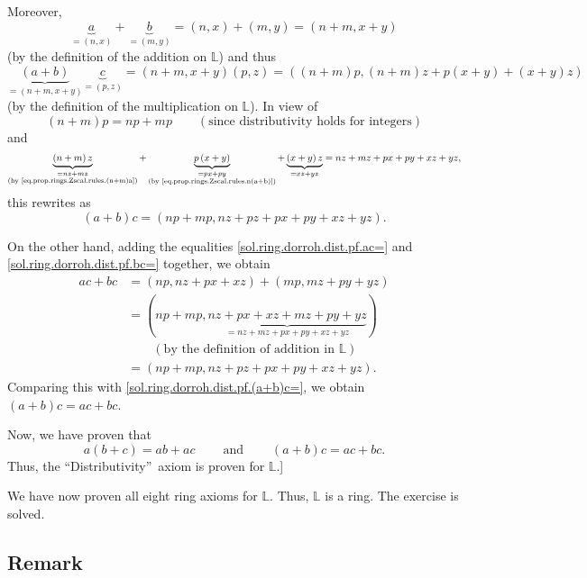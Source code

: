 \documentclass[paper=a4, fontsize=12pt]{scrartcl}%
\theoremstyle{plainsl}
\theoremstyle{definition}
\theoremstyle{remark}
\begin{document}
Moreover,%
\[
\underbrace{a}_{=\left(  n,x\right)  }+\underbrace{b}_{=\left(  m,y\right)
}=\left(  n,x\right)  +\left(  m,y\right)  =\left(  n+m,x+y\right)
\]
(by the definition of the addition on $\mathbb{L}$) and thus%
\[
\underbrace{\left(  a+b\right)  }_{=\left(  n+m,x+y\right)  }\underbrace{c}%
_{=\left(  p,z\right)  }=\left(  n+m,x+y\right)  \left(  p,z\right)  =\left(
\left(  n+m\right)  p,\left(  n+m\right)  z+p\left(  x+y\right)  +\left(
x+y\right)  z\right)
\]
(by the definition of the multiplication on $\mathbb{L}$). In view of%
\[
\left(  n+m\right)  p=np+mp\qquad\left(  \text{since distributivity holds for
integers}\right)
\]
and%
\[
\underbrace{\left(  n+m\right)  z}_{\substack{=nz+mz\\\text{(by
\eqref{eq.prop.rings.Zscal.rules.(n+m)a})}}}+\underbrace{p\left(  x+y\right)
}_{\substack{=px+py\\\text{(by \eqref{eq.prop.rings.Zscal.rules.n(a+b)})}%
}}+\underbrace{\left(  x+y\right)  z}_{=xz+yz}=nz+mz+px+py+xz+yz,
\]
this rewrites as%
\begin{equation}
\left(  a+b\right)  c=\left(  np+mp,nz+pz+px+py+xz+yz\right)  .
\label{sol.ring.dorroh.dist.pf.(a+b)c=}%
\end{equation}


On the other hand, adding the equalities \eqref{sol.ring.dorroh.dist.pf.ac=}
and \eqref{sol.ring.dorroh.dist.pf.bc=} together, we obtain%
\begin{align*}
ac+bc  &  =\left(  np,nz+px+xz\right)  +\left(  mp,mz+py+yz\right) \\
&  =\left(  np+mp,\underbrace{nz+px+xz+mz+py+yz}_{=nz+mz+px+py+xz+yz}\right)
\\
&  \qquad\left(  \text{by the definition of addition in }\mathbb{L}\right) \\
&  =\left(  np+mp,nz+pz+px+py+xz+yz\right)  .
\end{align*}
Comparing this with \eqref{sol.ring.dorroh.dist.pf.(a+b)c=}, we obtain
$\left(  a+b\right)  c=ac+bc$.

Now, we have proven that%
\[
a\left(  b+c\right)  =ab+ac\ \ \ \ \ \ \ \ \ \ \text{and}%
\ \ \ \ \ \ \ \ \ \ \left(  a+b\right)  c=ac+bc.
\]
Thus, the \textquotedblleft Distributivity\textquotedblright\ axiom is proven
for $\mathbb{L}$.]

We have now proven all eight ring axioms for $\mathbb{L}$. Thus, $\mathbb{L}$
is a ring. The exercise is solved.

\subsection{Remark}
\end{document}

